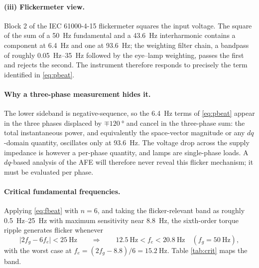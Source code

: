 \documentclass[11pt,a4paper]{article}
\begin{document}
\paragraph{(iii) Flickermeter view.} Block 2 of the IEC 61000-4-15 flickermeter
squares the input voltage. The square of the sum of a \SI{50}{\hertz}
fundamental and a \SI{43.6}{\hertz} interharmonic contains a component at
\SI{6.4}{\hertz} and one at \SI{93.6}{\hertz}; the weighting filter chain, a
bandpass of roughly \SIrange{0.05}{35}{\hertz} followed by the eye--lamp
weighting, passes the first and rejects the second. The instrument therefore
responds to precisely the term identified in \eqref{eq:pbeat}.

\paragraph{Why a three-phase measurement hides it.} The lower sideband is
negative-sequence, so the \SI{6.4}{\hertz} terms of \eqref{eq:pbeat} appear in
the three phases displaced by $\mp\SI{120}{\degree}$ and cancel in the
three-phase sum: the total instantaneous power, and equivalently the space-vector
magnitude or any $dq$-domain quantity, oscillates only at \SI{93.6}{\hertz}. The
voltage drop across the supply impedance is however a per-phase quantity, and
lamps are single-phase loads. A $dq$-based analysis of the AFE will therefore
never reveal this flicker mechanism; it must be evaluated per phase.

\paragraph{Critical fundamental frequencies.} Applying \eqref{eq:fbeat} with
$n=6$, and taking the flicker-relevant band as roughly
\SIrange{0.5}{25}{\hertz} with maximum sensitivity near \SI{8.8}{\hertz}, the
sixth-order torque ripple generates flicker whenever
\begin{equation}
\big|2f_{g}-6f_{e}\big| < \SI{25}{\hertz}
\qquad\Longrightarrow\qquad
\SI{12.5}{\hertz} < f_{e} < \SI{20.8}{\hertz}
\quad (f_{g}=\SI{50}{\hertz}),
\end{equation}
with the worst case at $f_{e}=(2f_{g}-8.8)/6=\SI{15.2}{\hertz}$. Table
\ref{tab:crit} maps the band.
\end{document}
